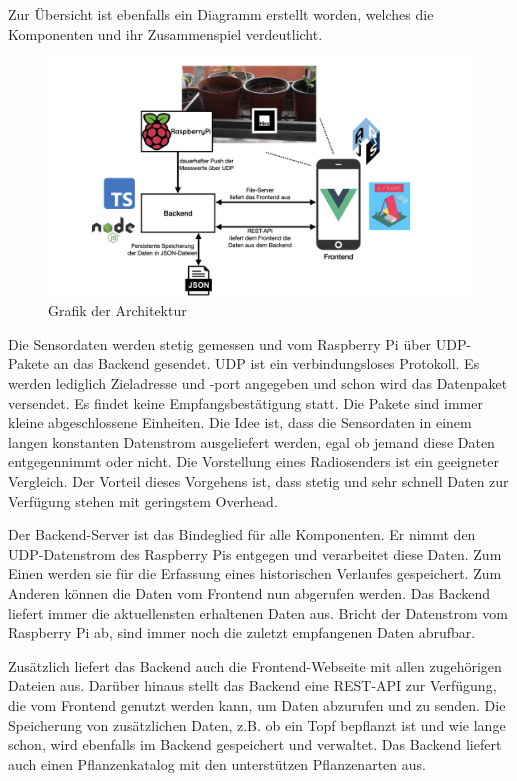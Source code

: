 Zur Übersicht ist ebenfalls ein Diagramm erstellt worden, welches die
Komponenten und ihr Zusammenspiel verdeutlicht.

\begin{figure}
\centering
\includegraphics{img/architektur.png}
\caption{Grafik der Architektur}
\end{figure}

Die Sensordaten werden stetig gemessen und vom Raspberry Pi über
UDP-Pakete an das Backend gesendet. UDP ist ein verbindungsloses
Protokoll. Es werden lediglich Zieladresse und -port angegeben und schon
wird das Datenpaket versendet. Es findet keine Empfangsbestätigung
statt. Die Pakete sind immer kleine abgeschlossene Einheiten. Die Idee
ist, dass die Sensordaten in einem langen konstanten Datenstrom
ausgeliefert werden, egal ob jemand diese Daten entgegennimmt oder
nicht. Die Vorstellung eines Radiosenders ist ein geeigneter Vergleich.
Der Vorteil dieses Vorgehens ist, dass stetig und sehr schnell Daten zur
Verfügung stehen mit geringstem Overhead.

Der Backend-Server ist das Bindeglied für alle Komponenten. Er nimmt den
UDP-Datenstrom des Raspberry Pis entgegen und verarbeitet diese Daten.
Zum Einen werden sie für die Erfassung eines historischen Verlaufes
gespeichert. Zum Anderen können die Daten vom Frontend nun abgerufen
werden. Das Backend liefert immer die aktuellensten erhaltenen Daten
aus. Bricht der Datenstrom vom Raspberry Pi ab, sind immer noch die
zuletzt empfangenen Daten abrufbar.

Zusätzlich liefert das Backend auch die Frontend-Webseite mit allen
zugehörigen Dateien aus. Darüber hinaus stellt das Backend eine REST-API
zur Verfügung, die vom Frontend genutzt werden kann, um Daten abzurufen
und zu senden. Die Speicherung von zusätzlichen Daten, z.B. ob ein Topf
bepflanzt ist und wie lange schon, wird ebenfalls im Backend gespeichert
und verwaltet. Das Backend liefert auch einen Pflanzenkatalog mit den
unterstützen Pflanzenarten aus.

